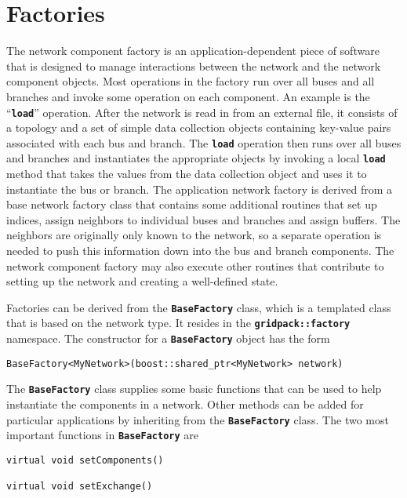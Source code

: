 \section{Factories}

The network component factory is an application-dependent piece of software that is designed to manage interactions between the network and the network component objects. Most operations in the factory run over all buses and all branches and invoke some operation on each component. An example is the ``\texttt{\textbf{load}}'' operation. After the network is read in from an external file, it consists of a topology and a set of simple data collection objects containing key-value pairs associated with each bus and branch. The \texttt{\textbf{load}} operation then runs over all buses and branches and instantiates the appropriate objects by invoking a local \texttt{\textbf{load}} method that takes the values from the data collection object and uses it to instantiate the bus or branch. The application network factory is derived from a base network factory class that contains some additional routines that set up indices, assign neighbors to individual buses and branches and assign buffers. The neighbors are originally only known to the network, so a separate operation is needed to push this information down into the bus and branch components. The network component factory may also execute other routines that contribute to setting up the network and creating a well-defined state.

Factories can be derived from the \texttt{\textbf{BaseFactory}} class, which is a templated class that is based on the network type. It resides in the \texttt{\textbf{gridpack::factory}} namespace. The constructor for a \texttt{\textbf{BaseFactory}} object has the form

{
\color{red}
\begin{Verbatim}[fontseries=b]
BaseFactory<MyNetwork>(boost::shared_ptr<MyNetwork> network)
\end{Verbatim}
}

The \texttt{\textbf{BaseFactory}} class supplies some basic functions that can be used to help instantiate the components in a network. Other methods can be added for particular applications by inheriting from the \texttt{\textbf{BaseFactory}} class. The two most important functions in \texttt{\textbf{BaseFactory}} are

{
\color{red}
\begin{Verbatim}[fontseries=b]
virtual void setComponents()

virtual void setExchange()
\end{Verbatim}
}

